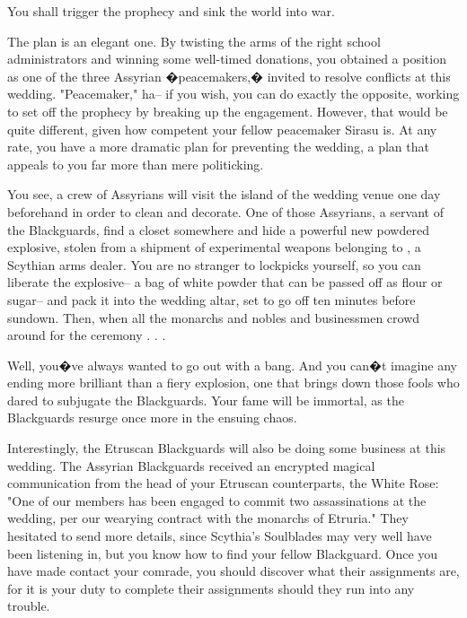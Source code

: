 \documentclass[char]{Kos}
\begin{document}
You shall trigger the prophecy and sink the world into war.

The plan is an elegant one. By twisting the arms of the right school administrators and winning some well-timed donations, you obtained a position as one of the three Assyrian �peacemakers,� invited to resolve conflicts at this wedding. "Peacemaker," ha-- if you wish, you can do exactly the opposite, working to set off the prophecy by breaking up the engagement. However, that would be quite different, given how competent your fellow peacemaker Sirasu is. At any rate, you have a more dramatic plan for preventing the wedding, a plan that appeals to you far more than mere politicking.

You see, a crew of Assyrians will visit the island of the wedding venue one day beforehand in order to clean and decorate. One of those Assyrians, a servant of the Blackguards, find a closet somewhere and hide a powerful new powdered explosive, stolen from a shipment of experimental weapons belonging to \cArmsDealer{\name}, a Scythian arms dealer. You are no stranger to lockpicks yourself, so you can liberate the explosive-- a bag of white powder that can be passed off as flour or sugar-- and pack it into the wedding altar, set to go off ten minutes before sundown. Then, when all the monarchs and nobles and businessmen crowd around for the ceremony . . .

Well, you�ve always wanted to go out with a bang. And you can�t imagine any ending more brilliant than a fiery explosion, one that brings down those fools who dared to subjugate the Blackguards. Your fame will be immortal, as the Blackguards resurge once more in the ensuing chaos.

Interestingly, the Etruscan Blackguards will also be doing some business at this wedding. The Assyrian Blackguards received an encrypted magical communication from the head of your Etruscan counterparts, the White Rose: "One of our members has been engaged to commit two assassinations at the wedding, per our wearying contract with the monarchs of Etruria." They hesitated to send more details, since Scythia's Soulblades may very well have been listening in, but you know how to find your fellow Blackguard. Once you have made contact your comrade, you should discover what their assignments are, for it is your duty to complete their assignments should they run into any trouble.
\end{document}
